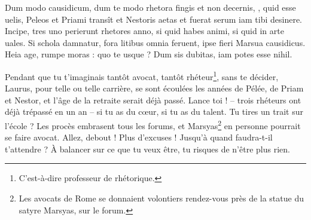 \documentclass[12pt]{book} %
\begin{document}
\begin{alignment}
  \begin{edition}
        Dum modo causidicum, dum te modo rhetora fingis 
        et non decernis, , quid esse uelis, 
        Peleos et Priami transît et Nestoris aetas 
        et fuerat serum iam tibi desinere. 
        Incipe, tres uno perierunt rhetores anno, 
        si quid habes animi, si quid in arte uales. 
        Si schola damnatur, fora litibus omnia feruent, 
        ipse  fieri Marsua causidicus. 
        Heia age, rumpe moras : quo te  usque ? 
        Dum  sis dubitas, iam potes esse nihil.   
  \end{edition}
  \begin{translation}
        Pendant que tu t'imaginais tantôt avocat, tantôt rhéteur\footnote{C'est-à-dire professeur de rhétorique.},
        sans te décider, Laurus, pour telle ou telle carrière, 
        se sont écoulées les années de Pélée, de Priam et Nestor, 
        et l'âge de la retraite serait déjà passé. 
        Lance toi ! – trois rhéteurs ont déjà trépassé en un an – 
        si tu as du c\oe ur, si tu as du talent. 
        Tu tires un trait sur l'école ? Les procès embrasent tous les forums, 
        et Marsyas\footnote{Les avocats de Rome se donnaient volontiers rendez-vous près de la statue du satyre Marsyas, sur le forum.} en personne pourrait se faire avocat. 
        Allez, debout ! Plus d'excuses ! Jusqu'à quand faudra-t-il t'attendre ? 
        À balancer sur ce que tu veux être, tu risques de n'être plus rien. 
  \end{translation}
\end{alignment}
\end{document}
